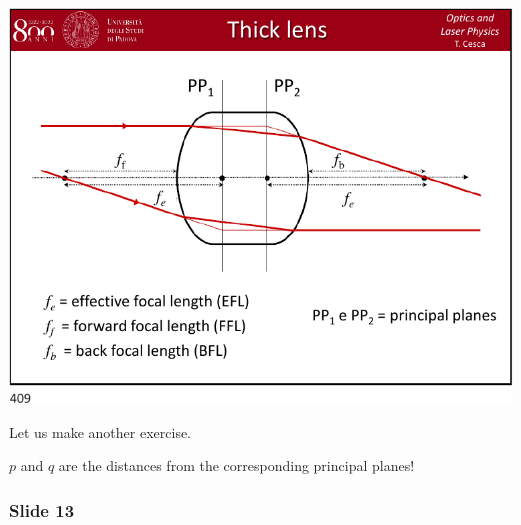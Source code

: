 \documentclass[../main/main.tex]{subfiles}
\begin{document}
\begin{minipage}[]{0.5\linewidth}
\centering
\includegraphics[page=12,width=1\textwidth]{../lessons/pdf_file/20_lecture.pdf}
\end{minipage}
\hspace{0.3cm}\vspace{0.3cm}
\begin{minipage}[c]{0.47\linewidth}

Let us make another exercise.

\( p \) and \( q \) are the distances from the corresponding principal planes!

\end{minipage}

\subsubsection*{Slide 13}
\end{document}
